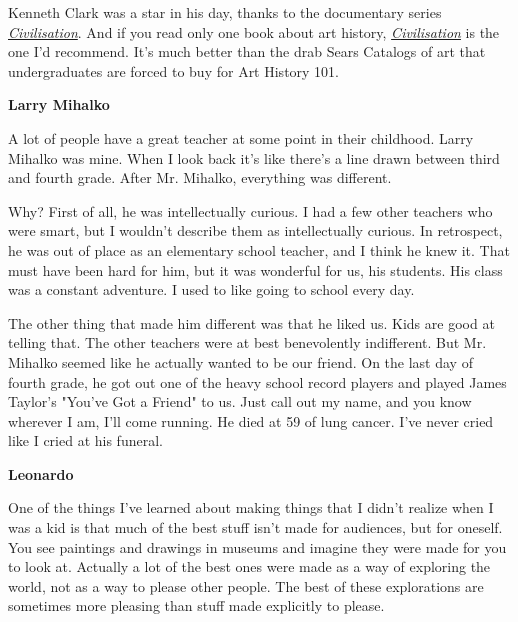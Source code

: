 Kenneth Clark was a star in his day, thanks
                  to the documentary series
                  \href{http://www.amazon.com/dp/B000F0UUKA}{\emph{Civilisation}}. And if you read only one book about art history,
                  \href{http://www.abebooks.com/servlet/SearchResults?an=clark\&sts=t\&tn=civilisation}{\emph{Civilisation}}
                  is the one I'd recommend. It's much better than the drab Sears
                  Catalogs of art that undergraduates are forced to buy for Art
                  History 101.


                  \textbf{Larry Mihalko}

A lot of people have a great
                  teacher at some point in their childhood. Larry Mihalko was
                  mine. When I look back it's like there's a line drawn between
                  third and fourth grade. After Mr. Mihalko, everything was
                  different.

Why? First of all, he was intellectually
                  curious. I had a few other teachers who were smart, but I
                  wouldn't describe them as intellectually curious. In
                  retrospect, he was out of place as an elementary school
                  teacher, and I think he knew it. That must have been hard for
                  him, but it was wonderful for us, his students. His class was
                  a constant adventure. I used to like going to school every
                  day.

The other thing that made him different was
                  that he liked us. Kids are good at telling that. The other
                  teachers were at best benevolently indifferent. But Mr.
                  Mihalko seemed like he actually wanted to be our friend. On
                  the last day of fourth grade, he got out one of the heavy
                  school record players and played James Taylor's "You've Got a
                  Friend" to us. Just call out my name, and you know wherever I
                  am, I'll come running. He died at 59 of lung cancer. I've
                  never cried like I cried at his funeral.


                  \textbf{Leonardo}

One of the things I've learned
                  about making things that I didn't realize when I was a kid is
                  that much of the best stuff isn't made for audiences, but for
                  oneself. You see paintings and drawings in museums and imagine
                  they were made for you to look at. Actually a lot of the best
                  ones were made as a way of exploring the world, not as a way
                  to please other people. The best of these explorations are
                  sometimes more pleasing than stuff made explicitly to
                  please.

